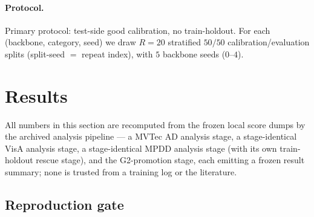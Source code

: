 \documentclass[preprint,11pt]{elsarticle}
\begin{document}
\paragraph{Protocol.} Primary protocol: test-side good calibration, no
train-holdout. For each (backbone, category, seed) we draw $R=20$ stratified $50/50$
calibration/evaluation splits (split-seed $=$ repeat index), with $5$ backbone seeds ($0$--$4$).

\section{Results}
\label{sec:results}

All numbers in this section are recomputed from the frozen local score dumps by the archived
analysis pipeline --- a MVTec AD analysis stage, a stage-identical VisA analysis stage, a
stage-identical MPDD analysis stage (with its own train-holdout rescue stage), and the
G2-promotion stage, each emitting a frozen result summary; none is trusted from a training log or
the literature.

\subsection{Reproduction gate}
\label{sec:repro}
\end{document}
